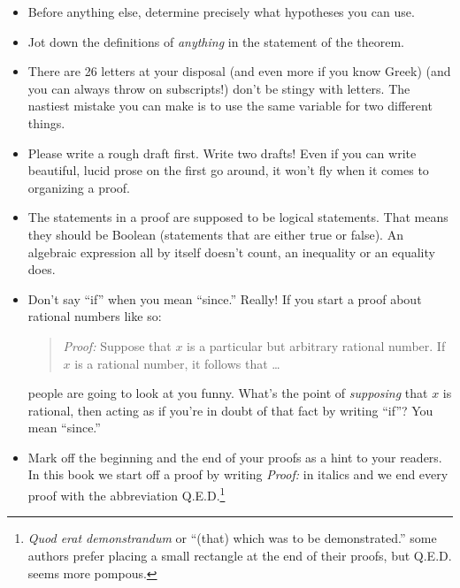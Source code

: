 \documentclass[10pt,]{book}
\theoremstyle{plain}
\theoremstyle{definition}
\theoremstyle{definition}
\numberwithin{equation}{section}
\begin{document}
  \leavevmode%
\begin{itemize}[label=\textbullet]
\item{}
        Before anything else, determine precisely what hypotheses you
        can use.
\item{}
        Jot down the definitions of \emph{anything} in the statement of 
        the theorem.
\item{}
        There are 26 letters at your disposal (and even more if you know
        Greek) (and you can always throw on subscripts!) don't be stingy with
        letters.  The nastiest mistake you can make is to use the same variable
        for two different things.
\item{}
        Please write a rough draft first.  Write two drafts!  Even if you
        can write beautiful, lucid prose on the first go around, it won't fly
        when it comes to organizing a proof.
\item{}
        The statements in a proof are supposed to be logical statements.
        That means they should be Boolean (statements that are either true or false).
        An algebraic expression all by itself doesn't count, an inequality or an 
        equality does.
\item{}
        Don't say ``if'' when you mean ``since.''  Really!  If you start a
        proof about rational numbers like so:
        \begin{quote}\emph{Proof:} Suppose that \(x\) is a particular but arbitrary rational number.
        If \(x\) is a rational number, it follows that \ldots
        \end{quote}

        people are going to look at you funny.  What's the point of 
        \emph{supposing}
        that \(x\) is rational, then acting as if you're in doubt of that fact by
        writing ``if''?   You mean ``since.''
\item{}
        Mark off the beginning and the end of your proofs as a hint to your
        readers.  In this book we start off a proof by writing \emph{Proof:} in 
        italics and we end every proof with the abbreviation 
        Q.E.D.\footnote{\emph{Quod erat demonstrandum} or ``(that) which was to 
        be demonstrated.'' some authors prefer placing a small rectangle at 
        the end of their proofs, but Q.E.D. seems more pompous.\label{fn-19}}
\end{itemize}
\end{document}
